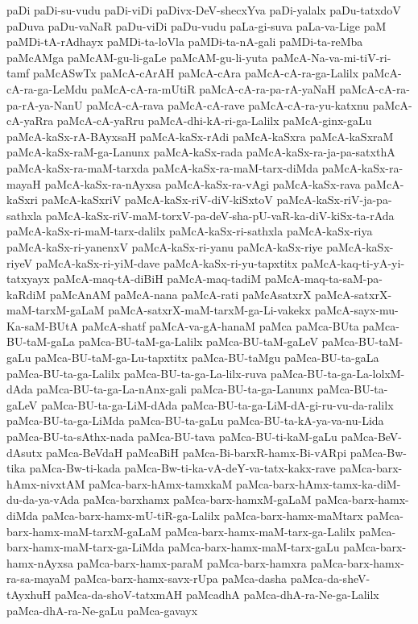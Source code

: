 {paDi
paDi-su-vudu
paDi-viDi
paDivx-DeV-shecxYva
paDi-yalalx
paDu-tatxdoV
paDuva
paDu-vaNaR
paDu-viDi
paDu-vudu
paLa-gi-suva
paLa-va-Lige
paM
paMDi-tA-rAdhayx
paMDi-ta-loVla
paMDi-ta-nA-gali
paMDi-ta-reMba
paMcAMga
paMcAM-gu-li-gaLe
paMcAM-gu-li-yuta
paMcA-Na-va-mi-tiV-ri-tamf
paMcASwTx
paMcA-cArAH
paMcA-cAra
paMcA-cA-ra-ga-Lalilx
paMcA-cA-ra-ga-LeMdu
paMcA-cA-ra-mUtiR
paMcA-cA-ra-pa-rA-yaNaH
paMcA-cA-ra-pa-rA-ya-NanU
paMcA-cA-rava
paMcA-cA-rave
paMcA-cA-ra-yu-katxnu
paMcA-cA-yaRra
paMcA-cA-yaRru
paMcA-dhi-kA-ri-ga-Lalilx
paMcA-ginx-gaLu
paMcA-kaSx-rA-BAyxsaH
paMcA-kaSx-rAdi
paMcA-kaSxra
paMcA-kaSxraM
paMcA-kaSx-raM-ga-Lanunx
paMcA-kaSx-rada
paMcA-kaSx-ra-ja-pa-satxthA
paMcA-kaSx-ra-maM-tarxda
paMcA-kaSx-ra-maM-tarx-diMda
paMcA-kaSx-ra-mayaH
paMcA-kaSx-ra-nAyxsa
paMcA-kaSx-ra-vAgi
paMcA-kaSx-rava
paMcA-kaSxri
paMcA-kaSxriV
paMcA-kaSx-riV-diV-kiSxtoV
paMcA-kaSx-riV-ja-pa-sathxla
paMcA-kaSx-riV-maM-torxV-pa-deV-sha-pU-vaR-ka-diV-kiSx-ta-rAda
paMcA-kaSx-ri-maM-tarx-dalilx
paMcA-kaSx-ri-sathxla
paMcA-kaSx-riya
paMcA-kaSx-ri-yanenxV
paMcA-kaSx-ri-yanu
paMcA-kaSx-riye
paMcA-kaSx-riyeV
paMcA-kaSx-ri-yiM-dave
paMcA-kaSx-ri-yu-tapxtitx
paMcA-kaq-ti-yA-yi-tatxyayx
paMcA-maq-tA-diBiH
paMcA-maq-tadiM
paMcA-maq-ta-saM-pa-kaRdiM
paMcAnAM
paMcA-nana
paMcA-rati
paMcAsatxrX
paMcA-satxrX-maM-tarxM-gaLaM
paMcA-satxrX-maM-tarxM-ga-Li-vakekx
paMcA-sayx-mu-Ka-saM-BUtA
paMcA-shatf
paMcA-va-gA-hanaM
paMca
paMca-BUta
paMca-BU-taM-gaLa
paMca-BU-taM-ga-Lalilx
paMca-BU-taM-gaLeV
paMca-BU-taM-gaLu
paMca-BU-taM-ga-Lu-tapxtitx
paMca-BU-taMgu
paMca-BU-ta-gaLa
paMca-BU-ta-ga-Lalilx
paMca-BU-ta-ga-La-lilx-ruva
paMca-BU-ta-ga-La-lolxM-dAda
paMca-BU-ta-ga-La-nAnx-gali
paMca-BU-ta-ga-Lanunx
paMca-BU-ta-gaLeV
paMca-BU-ta-ga-LiM-dAda
paMca-BU-ta-ga-LiM-dA-gi-ru-vu-da-ralilx
paMca-BU-ta-ga-LiMda
paMca-BU-ta-gaLu
paMca-BU-ta-kA-ya-va-nu-Lida
paMca-BU-ta-sAthx-nada
paMca-BU-tava
paMca-BU-ti-kaM-gaLu
paMca-BeV-dAsutx
paMca-BeVdaH
paMcaBiH
paMca-Bi-barxR-hamx-Bi-vARpi
paMca-Bw-tika
paMca-Bw-ti-kada
paMca-Bw-ti-ka-vA-deY-va-tatx-kakx-rave
paMca-barx-hAmx-nivxtAM
paMca-barx-hAmx-tamxkaM
paMca-barx-hAmx-tamx-ka-diM-du-da-ya-vAda
paMca-barxhamx
paMca-barx-hamxM-gaLaM
paMca-barx-hamx-diMda
paMca-barx-hamx-mU-tiR-ga-Lalilx
paMca-barx-hamx-maMtarx
paMca-barx-hamx-maM-tarxM-gaLaM
paMca-barx-hamx-maM-tarx-ga-Lalilx
paMca-barx-hamx-maM-tarx-ga-LiMda
paMca-barx-hamx-maM-tarx-gaLu
paMca-barx-hamx-nAyxsa
paMca-barx-hamx-paraM
paMca-barx-hamxra
paMca-barx-hamx-ra-sa-mayaM
paMca-barx-hamx-savx-rUpa
paMca-dasha
paMca-da-sheV-tAyxhuH
paMca-da-shoV-tatxmAH
paMcadhA
paMca-dhA-ra-Ne-ga-Lalilx
paMca-dhA-ra-Ne-gaLu
paMca-gavayx
}
